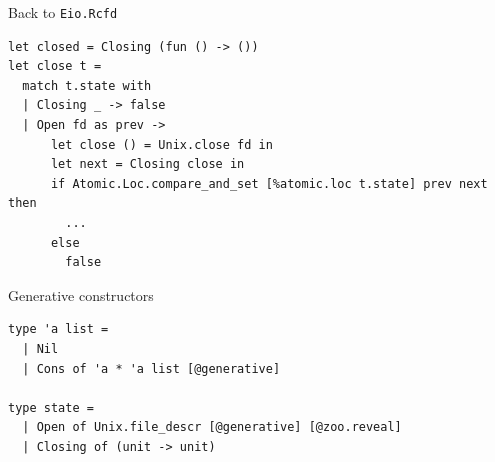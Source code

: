 \begin{frame}[fragile]{Back to \texttt{Eio.Rcfd}}
\begin{verbatim}
let closed = Closing (fun () -> ())
let close t =
  match t.state with
  | Closing _ -> false
  | Open fd as prev ->
      let close () = Unix.close fd in
      let next = Closing close in
      if Atomic.Loc.compare_and_set [%atomic.loc t.state] prev next then
        ...
      else
        false
\end{verbatim}
\end{frame}

\begin{frame}[fragile]{Generative constructors}
\Large
\begin{verbatim}
type 'a list =
  | Nil
  | Cons of 'a * 'a list [@generative]

type state =
  | Open of Unix.file_descr [@generative] [@zoo.reveal]
  | Closing of (unit -> unit)
\end{verbatim}
\end{frame}
